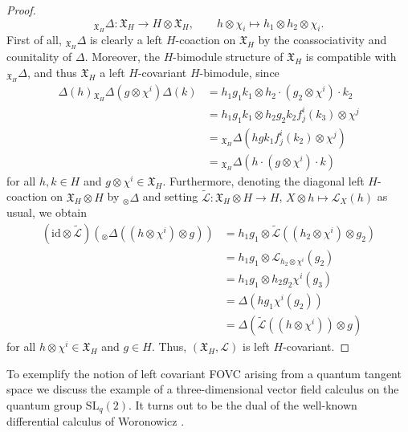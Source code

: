 \documentclass{article}
\theoremstyle{definition}
\begin{document}
\begin{proof}
		$$
		{}_{\mathfrak{X}_H}\Delta\colon\mathfrak{X}_H\to H\otimes \mathfrak{X}_H,\qquad h\otimes\chi_i\mapsto h_1\otimes h_2\otimes\chi_i.
		$$
		First of all, ${}_{\mathfrak{X}_H}\Delta$ is clearly a left $H$-coaction on $\mathfrak{X}_H$ by the coassociativity and counitality of $\Delta$. Moreover, the $H$-bimodule structure of $\mathfrak{X}_H$ is compatible with ${}_{\mathfrak{X}_H}\Delta$, and thus $\mathfrak{X}_H$ a left $H$-covariant $H$-bimodule, since
		\begin{align*}
			\Delta(h){}_{\mathfrak{X}_H}\Delta(g\otimes\chi^i)\Delta(k)
			&=h_1g_1k_1\otimes h_2\cdot(g_2\otimes\chi^i)\cdot k_2\\
			&=h_1g_1k_1\otimes h_2g_2k_2f^i_j(k_3)\otimes\chi^j\\
			&={}_{\mathfrak{X}_H}\Delta(hgk_1f^i_j(k_2)\otimes\chi^j)\\
			&={}_{\mathfrak{X}_H}\Delta(h\cdot(g\otimes\chi^i)\cdot k)
		\end{align*}
		for all $h,k\in H$ and $g\otimes\chi^i\in\mathfrak{X}_H$.
		Furthermore, denoting the diagonal left $H$-coaction on $\mathfrak{X}_H\otimes H$ by ${}_\otimes\Delta$ and setting $\widetilde{\mathscr{L}}\colon\mathfrak{X}_H\otimes H\to H$, $X\otimes h\mapsto\mathscr{L}_X(h)$ as usual, we obtain
		\begin{align*}
			(\mathrm{id}\otimes\widetilde{\mathscr{L}})({}_\otimes\Delta((h\otimes\chi^i)\otimes g))
			&=h_1g_1\otimes\widetilde{\mathscr{L}}((h_2\otimes\chi^i)\otimes g_2)\\
			&=h_1g_1\otimes\mathscr{L}_{h_2\otimes\chi^i}(g_2)\\
			&=h_1g_1\otimes h_2g_2\chi^i(g_3)\\
			&=\Delta(hg_1\chi^i(g_2))\\
			&=\Delta(\widetilde{\mathscr{L}}((h\otimes\chi^i))\otimes g)
		\end{align*}
		for all $h\otimes\chi^i\in\mathfrak{X}_H$ and $g\in H$. Thus, $(\mathfrak{X}_H,\mathscr{L})$ is left $H$-covariant.
	\end{proof}
	
	To exemplify the notion of left covariant FOVC arising from a quantum tangent space we discuss the example of a three-dimensional vector field calculus on the quantum group $\mathrm{SL}_q(2)$. It turns out to be the dual of the well-known differential calculus of Woronowicz \cite{Woronowicz1989}.
	
\end{document}
